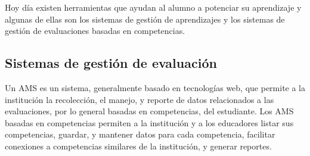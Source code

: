

Hoy día existen herramientas que ayudan al alumno a potenciar su aprendizaje y algunas de ellas son los sistemas de gestión de aprendizajes y los sistemas de gestión de evaluaciones basadas en competencias.

\subsection{Sistemas de gestión de evaluación}
Un AMS es un sistema, generalmente basado en tecnologías web, que permite a la institución la recolección, el manejo, y reporte de datos relacionados a las evaluaciones, por lo general basadas en competencias, del estudiante. Los AMS basadas en competencias permiten a la institución y a los educadores listar sus competencias, guardar, y mantener datos para cada competencia, facilitar conexiones a competencias similares de la institución, y generar reportes\citep{cartwright2009student}.



